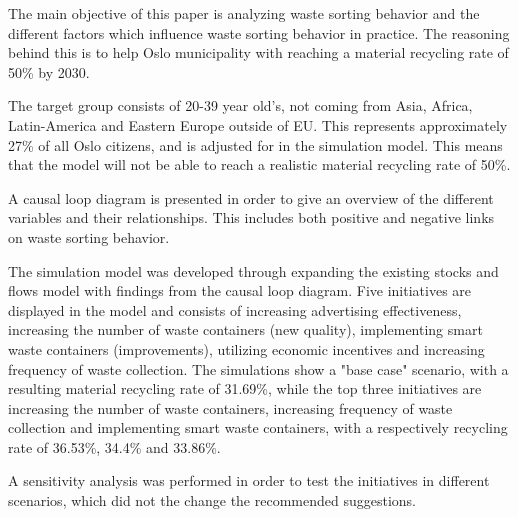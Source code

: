 The main objective of this paper is analyzing waste sorting behavior and the different factors which influence waste sorting behavior in practice. The reasoning behind this is to help Oslo municipality with reaching a material recycling rate of 50\% by 2030. 

\indent \newline 
The target group consists of 20-39 year old's, not coming from Asia, Africa, Latin-America and Eastern Europe outside of EU. This represents approximately 27\% of all Oslo citizens, and is adjusted for in the simulation model. This means that the model will not be able to reach a realistic material recycling rate of 50\%.

\indent \newline 
A causal loop diagram is presented in order to give an overview of the different variables and their relationships. This includes both positive and negative links on waste sorting behavior. 

\indent \newline 
The simulation model was developed through expanding the existing stocks and flows model with findings from the causal loop diagram. Five initiatives are displayed in the model and consists of increasing advertising effectiveness, increasing the number of waste containers (new quality), implementing smart waste containers (improvements), utilizing economic incentives and increasing frequency of waste collection. The simulations show a "base case" scenario, with a resulting material recycling rate of 31.69\%, while the top three initiatives are increasing the number of waste containers, increasing frequency of waste collection and implementing smart waste containers, with a respectively recycling rate of 36.53\%, 34.4\% and 33.86\%.

\indent \newline 
A sensitivity analysis was performed in order to test the initiatives in different scenarios, which did not the change the recommended suggestions. 